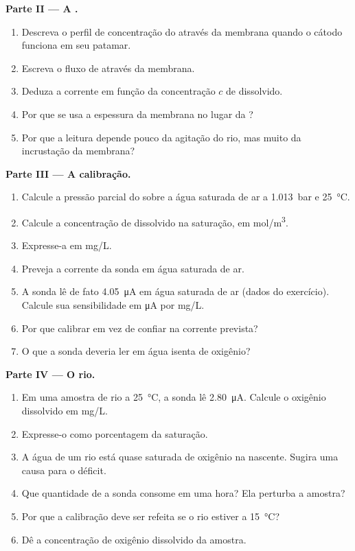 \begin{problem}
\medskip
\noindent\textbf{Parte II --- A .}
\begin{enumerate}[resume]
  \item Descreva o perfil de concentração do  através da membrana quando o
        cátodo funciona em seu patamar.
  \item Escreva o fluxo de  através da membrana.
  \item Deduza a corrente em função da concentração $c$ de 
        dissolvido.
  \item Por que se usa a espessura da membrana no lugar da ?
  \item Por que a leitura depende pouco da agitação do rio, mas muito da
        incrustação da membrana?
\end{enumerate}

\medskip
\noindent\textbf{Parte III --- A calibração.}
\begin{enumerate}[resume]
  \item Calcule a pressão parcial do  sobre a água saturada de ar a
        \qty{1.013}{bar} e \qty{25}{\degreeCelsius}.
  \item Calcule a concentração de  dissolvido na saturação, em
        \unit{mol/m^3}.
  \item Expresse-a em \unit{mg/L}.
  \item Preveja a corrente da sonda em água saturada de ar.
  \item A sonda lê de fato \qty{4.05}{\micro A} em água saturada de ar
        (dados do exercício). Calcule sua sensibilidade em \unit{\micro A} por
        \unit{mg/L}.
  \item Por que calibrar em vez de confiar na corrente prevista?
  \item O que a sonda deveria ler em água isenta de oxigênio?
\end{enumerate}

\medskip
\noindent\textbf{Parte IV --- O rio.}
\begin{enumerate}[resume]
  \item Em uma amostra de rio a \qty{25}{\degreeCelsius}, a sonda lê
        \qty{2.80}{\micro A}. Calcule o oxigênio dissolvido em \unit{mg/L}.
  \item Expresse-o como porcentagem da saturação.
  \item A água de um rio está quase saturada de oxigênio na nascente.
        Sugira uma causa para o déficit.
  \item Que quantidade de  a sonda consome em uma hora? Ela perturba
        a amostra?
  \item Por que a calibração deve ser refeita se o rio estiver a
        \qty{15}{\degreeCelsius}?
  \item Dê a concentração de oxigênio dissolvido da amostra.
\end{enumerate}
\end{problem}
